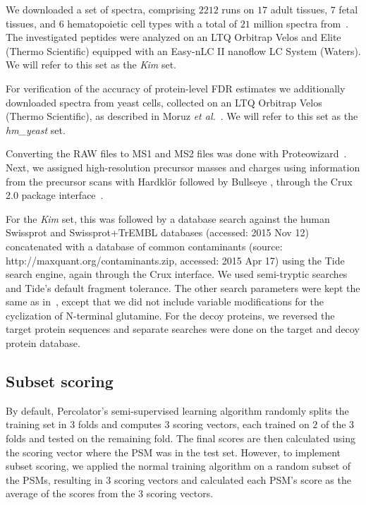 \documentclass{article}
\begin{document}
We downloaded a set of spectra, comprising $2212$ runs on $17$ adult
tissues, $7$ fetal tissues, and $6$ hematopoietic cell types with a
total of $21$ million spectra from~\cite{kim2014draft}. The
investigated peptides were analyzed on an LTQ Orbitrap Velos and Elite
(Thermo Scientific) equipped with an Easy-nLC II nanoflow LC System
(Waters). We will refer to this set as the {\em Kim} set.

For verification of the accuracy of protein-level FDR estimates we
additionally downloaded spectra from yeast cells, collected on an LTQ
Orbitrap Velos (Thermo Scientific), as described in Moruz {\em et 
al.}~\cite{moruz2013}. We will refer to this set as the {\em
hm\_yeast} set.

Converting the RAW files to MS1 and MS2 files was done with
Proteowizard~\cite{kessner2008}. Next, we assigned high-resolution
precursor masses and charges using information from the precursor
scans with Hardkl\"{o}r \cite{hoopmann2007} followed by Bullseye
\cite{hsieh2009}, through the Crux 2.0 package
interface~\cite{mcilwain2014}. 

For the {\em Kim} set, this was followed by a database search against
the human Swissprot and Swissprot+TrEMBL databases (accessed: 2015 Nov
12) concatenated with a database of common contaminants (source:
http://maxquant.org/contaminants.zip, accessed: 2015 Apr 17) using the
Tide search engine, again through the Crux interface. We used
semi-tryptic searches and Tide's default fragment tolerance. The other
search parameters were kept the same as in~\cite{kim2014draft}, except
that we did not include variable modifications for the cyclization of
N-terminal glutamine. For the decoy proteins, we reversed the target
protein sequences and separate searches were done on the target and
decoy protein database.

\subsection*{Subset scoring}

By default, Percolator's semi-supervised learning algorithm randomly
splits the training set in $3$ folds and computes $3$ scoring vectors,
each trained on $2$ of the $3$ folds and tested on the remaining fold.
The final scores are then calculated using the scoring vector where
the PSM was in the test set. However, to implement subset scoring, we
applied the normal training algorithm on a random subset of the PSMs,
resulting in $3$ scoring vectors and calculated each PSM's score as
the average of the scores from the $3$ scoring vectors.
\end{document}
